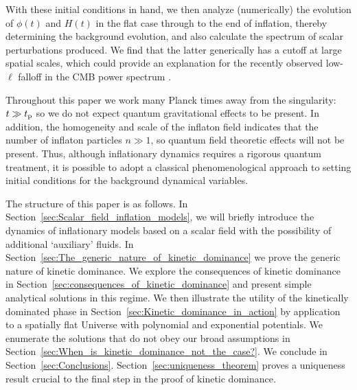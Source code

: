 With these initial conditions in hand, we then analyze (numerically) the evolution of $\phi(t)$ and $H(t)$ in the flat case through to the end of inflation, thereby determining the background evolution, and also calculate the spectrum of scalar perturbations produced. We find that the latter generically has a cutoff at large spatial scales, which could provide an explanation for the recently observed low-$\ell$ falloff in the CMB power spectrum \citep{hinshaw_nine-year_2012,planck_collaboration_planck_2013}.
 
Throughout this paper we work many Planck times away from the singularity: $t\gg t_{\mathrm{p}}$ so we do not expect quantum gravitational effects to be present.  In addition, the homogeneity and scale of the inflaton field indicates that the number of inflaton particles $n\gg1$, so quantum field theoretic effects will not be present.  Thus, although inflationary dynamics requires a rigorous quantum treatment, it is possible to adopt a classical phenomenological approach to setting initial conditions for the background dynamical variables.  

The structure of this paper is as follows.  In Section~\ref{sec:Scalar_field_inflation_models}, we will briefly introduce the dynamics of inflationary models based on a scalar field with the possibility of additional `auxiliary' fluids.  In Section~\ref{sec:The_generic_nature_of_kinetic_dominance} we prove the generic nature of kinetic dominance.  We explore the consequences of kinetic dominance in Section~\ref{sec:consequences_of_kinetic_dominance} and present simple analytical solutions in this regime.  We then illustrate the utility of the kinetically dominated phase in Section~\ref{sec:Kinetic_dominance_in_action} by application to a spatially flat Universe with polynomial and exponential potentials.  We enumerate the solutions that do not obey our broad assumptions in Section~\ref{sec:When_is_kinetic_dominance_not_the_case?}.  We conclude in Section~\ref{sec:Conclusions}. Section~\ref{sec:uniqueness_theorem} proves a uniqueness result crucial to the final step in the proof of kinetic dominance.  


